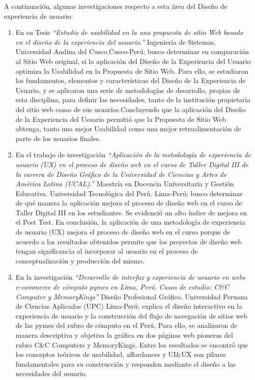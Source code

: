 \documentclass[10pt,conference]{IEEEtran}
\begin{document}
A continuación, algunas investigaciones respecto a esta área del Diseño de experiencia de usuario:
\begin{enumerate}
\item En su Tesis \textit{“Estudio de usabilidad en la una propuesta de sitio Web basado en el diseño de la experiencia del usuario.”} Ingeniería de Sistemas. Universidad Andina del Cusco.Cusco-Perú; \citep{venero} busco determinar en comparación al Sitio Web original, si la aplicación del Diseño de la Experiencia del Usuario optimiza la Usabilidad en la Propuesta de Sitio Web. Para ello, se estudiaron los fundamentos, elementos y características del Diseño de la Experiencia de Usuario, y se aplicaron una serie de metodologías de desarrollo, propias de esta disciplina, para definir las necesidades, tanto de la institución propietaria del sitio web como de sus usuarios.Concluyendo que la aplicación del Diseño de la Experiencia del Usuario permitió que la Propuesta de Sitio Web obtenga, tanto una mejor Usabilidad como una mejor retroalimentación de parte de los usuarios finales.
\item En el trabajo de investigación \textit{“Aplicación de la metodología de experiencia de usuario (UX) en el proceso de diseño web en el curso de Taller Digital III de la carrera de Diseño Gráfico de la Universidad de Ciencias y Artes de América Latina (UCAL).”} Maestría en Docencia Universitaria y Gestión Educativa. Universidad Tecnológica del Perú. Lima-Perú; \citep{rodri} busco determinar de qué manera la aplicación mejora el proceso de diseño web en el curso de Taller Digital III en los estudiantes. Se evidenció un alto índice de mejora en el Post Test. En conclusión, la aplicación de una metodología de experiencia de usuario (UX) mejora el proceso de diseño web en el curso porque de acuerdo a los resultados obtenidos permite que los proyectos de diseño web tengan significancia al incorporar al usuario en el proceso de conceptualización y producción del mismo.
\item En la investigación \textit{“Desarrollo de interfaz y experiencia de usuario en webs e-commerce de cómputo pymes en Lima, Perú. Casos de estudio: C\&C Computer y MemoryKings”} Diseño Profesional Gráfico. Universidad Peruana de Ciencias Aplicadas (UPC) Lima-Perú; \citep{soto} explica el diseño interactivo en la experiencia de usuario y la construcción del flujo de navegación de sitios web de las pymes del rubro de cómputo en el Perú. Para ello, se analizaron de manera descriptiva y objetiva la gráfica en dos páginas web pioneras del rubro C\&C Computers y MemoryKings.  Entre los resultados se encontró que los conceptos teóricos de usabilidad, affordances y UI\&UX son pilares fundamentales para su construcción y responden mediante el diseño a las necesidades del usuario.

\end{enumerate}
\end{document}
